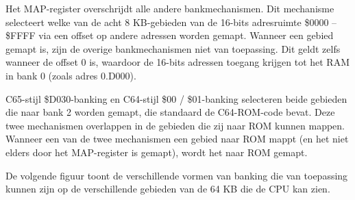 Het MAP-register overschrijdt alle andere bankmechanismen. Dit mechanisme selecteert welke van de acht 8 KB-gebieden van de 16-bits adresruimte \$0000 -- \$FFFF via een offset op andere adressen worden gemapt. Wanneer een gebied gemapt is, zijn de overige bankmechanismen niet van toepassing. Dit geldt zelfs wanneer de offset 0 is, waardoor de 16-bits adressen toegang krijgen tot het RAM in bank 0 (zoals adres 0.D000).

C65-stijl \$D030-banking en C64-stijl \$00 / \$01-banking selecteren beide gebieden die naar bank 2 worden gemapt, die standaard de C64-ROM-code bevat. Deze twee mechanismen overlappen in de gebieden die zij naar ROM kunnen mappen. Wanneer een van de twee mechanismen een gebied naar ROM mappt (en het niet elders door het MAP-register is gemapt), wordt het naar ROM gemapt.

De volgende figuur toont de verschillende vormen van banking die van toepassing kunnen zijn op de verschillende gebieden van de 64 KB die de CPU kan zien.

